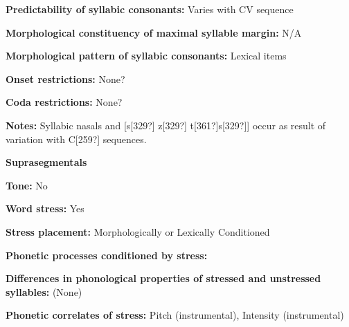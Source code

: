 \begin{styleBody}
\textbf{Predictability of syllabic consonants:} Varies with CV sequence
\end{styleBody}

\begin{styleBody}
\textbf{Morphological constituency of maximal syllable margin:} N/A
\end{styleBody}

\begin{styleBody}
\textbf{Morphological pattern of syllabic consonants:} Lexical items
\end{styleBody}

\begin{styleBody}
\textbf{Onset restrictions:} None?
\end{styleBody}

\begin{styleBody}
\textbf{Coda restrictions:} None?
\end{styleBody}

\begin{styleBody}
\textbf{Notes:} Syllabic nasals and [s[329?] z[329?] t[361?]s[329?]] occur as result of variation with C[259?] sequences.
\end{styleBody}

\begin{styleBody}
\textbf{Suprasegmentals}
\end{styleBody}

\begin{styleBody}
\textbf{Tone:} No
\end{styleBody}

\begin{styleBody}
\textbf{Word stress: }Yes
\end{styleBody}

\begin{styleBody}
\textbf{Stress placement:} Morphologically or Lexically Conditioned
\end{styleBody}

\begin{styleBody}
\textbf{Phonetic processes conditioned by stress:}
\end{styleBody}

\begin{styleBody}
\textbf{Differences in phonological properties of stressed and unstressed syllables:} (None)
\end{styleBody}

\begin{styleBody}
\textbf{Phonetic correlates of stress:} Pitch (instrumental), Intensity (instrumental)
\end{styleBody}

